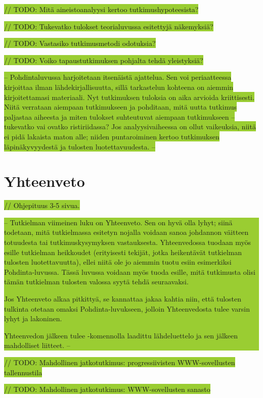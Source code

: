 \documentclass[utf8]{gradu3}
\begin{document}
\colorbox{YellowGreen}{// TODO: Mitä aineistoanalyysi kertoo tutkimushypoteesista?}

\colorbox{YellowGreen}{// TODO: Tukevatko tulokset teorialuvussa esitettyjä näkemyksiä?}

\colorbox{YellowGreen}{// TODO: Vastasiko tutkimusmetodi odotuksia?}

\colorbox{YellowGreen}{// TODO: Voiko tapaustutkimuksen pohjalta tehdä yleistyksiä?}

\colorbox{YellowGreen}{-- Pohdintaluvussa harjoitetaan itsenäistä ajattelua. Sen voi periaatteessa kirjoittaa ilman lähdekirjallisuutta, sillä tarkastelun kohteena on aiemmin kirjoitettamasi materiaali. Nyt tutkimuksen tuloksia on aika arvioida kriittisesti. Niitä verrataan aiempaan tutkimukseen ja pohditaan, mitä uutta tutkimus paljastaa aiheesta ja miten tulokset suhteutuvat aiempaan tutkimukseen – tukevatko vai ovatko ristiriidassa? Jos analyysivaiheessa on ollut vaikeuksia, niitä ei pidä lakaista maton alle; niiden puntaroiminen kertoo tutkimuksen läpinäkyvyydestä ja tulosten luotettavuudesta. --}

\chapter{Yhteenveto}
\colorbox{YellowGreen}{// Ohjepituus 3-5 sivua.}

\colorbox{YellowGreen}{-- Tutkielman viimeinen luku on Yhteenveto.  Sen on hyvä olla lyhyt; siinä todetaan, mitä tutkielmassa esitetyn nojalla voidaan sanoa johdannon väitteen totuudesta tai tutkimuskysymyksen vastauksesta. Yhteenvedossa tuodaan myös esille tutkielman heikkoudet (erityisesti tekijät, jotka heikentävät tutkielman tulosten luotettavuutta), ellei niitä ole jo aiemmin tuotu esiin esimerkiksi Pohdinta-luvussa. Tässä luvussa voidaan myös tuoda esille, mitä tutkimusta olisi tämän tutkielman tulosten valossa syytä tehdä seuraavaksi.

Jos Yhteenveto alkaa pitkittyä, se kannattaa jakaa kahtia niin, että tulosten tulkinta otetaan omaksi Pohdinta-luvukseen, jolloin Yhteenvedosta tulee varsin lyhyt ja lakoninen.

Yhteenvedon jälkeen tulee \string\printbibliography-komennolla laadittu lähdeluettelo ja sen jälkeen mahdolliset liitteet. --}

\colorbox{YellowGreen}{// TODO: Mahdollinen jatkotutkimus: progressiivisten WWW-sovellusten tallennustila}

\colorbox{YellowGreen}{// TODO: Mahdollinen jatkotutkimus: WWW-sovellusten sanasto}
\end{document}

